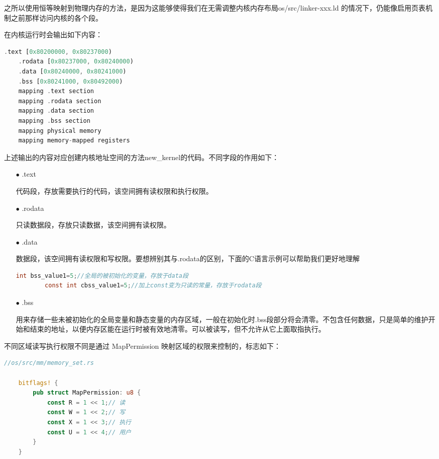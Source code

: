 之所以使用恒等映射到物理内存的方法，是因为这能够使得我们在无需调整内核内存布局os/src/linker-xxx.ld 的情况下，仍能像启用页表机制之前那样访问内核的各个段。

在内核运行时会输出如下内容：

\begin{lstlisting}[language={Rust}, label={code:forktest}
	]
	.text [0x80200000, 0x80237000)
	.rodata [0x80237000, 0x80240000)
	.data [0x80240000, 0x80241000)
	.bss [0x80241000, 0x80492000)
	mapping .text section
	mapping .rodata section
	mapping .data section
	mapping .bss section
	mapping physical memory
	mapping memory-mapped registers
\end{lstlisting}

上述输出的内容对应创建内核地址空间的方法new\_kernel的代码。不同字段的作用如下：

\begin{itemize}
	\item[$\bullet$] .text
	
	代码段，存放需要执行的代码，该空间拥有读权限和执行权限。
	
	\item[$\bullet$] .rodata
	
	只读数据段，存放只读数据，该空间拥有读权限。
	
	\item[$\bullet$] .data
	
	数据段，该空间拥有读权限和写权限。要想辨别其与.rodata的区别，下面的C语言示例可以帮助我们更好地理解
	
	\begin{lstlisting}[language={C}, label={code:forktest}]
		int bss_value1=5;//全局的被初始化的变量，存放于data段
		const int cbss_value1=5;//加上const变为只读的常量，存放于rodata段
	\end{lstlisting}
	
	\item[$\bullet$] .bss
	
	⽤来存储一些未被初始化的全局变量和静态变量的内存区域，一般在初始化时.bss段部分将会清零。不包含任何数据，只是简单的维护开始和结束的地址，以便内存区能在运行时被有效地清零。可以被读写，但不允许从它上面取指执行。
	
\end{itemize}


\hspace*{\fill}

不同区域读写执行权限不同是通过 MapPermission 映射区域的权限来控制的，标志如下：
\begin{lstlisting}[language={Rust}, label={code:memoryset}]
	//os/src/mm/memory_set.rs
	
	bitflags! {
		pub struct MapPermission: u8 {
			const R = 1 << 1;// 读
			const W = 1 << 2;// 写
			const X = 1 << 3;// 执⾏
			const U = 1 << 4;// 用户
		}
	}
\end{lstlisting}

